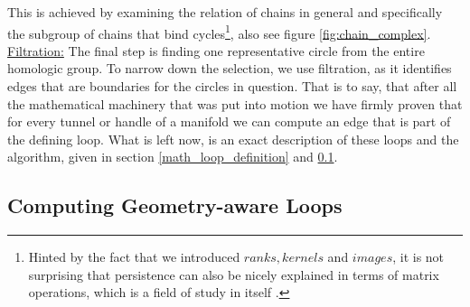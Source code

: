 This is achieved by examining the relation of chains in general and specifically the subgroup of chains that bind cycles\footnote{ Hinted by the fact that we introduced $ranks, kernels$ and $images$, it is not surprising that persistence can also be nicely explained in terms of matrix operations, which is a field of study in itself \citep[see chapters IV-3 and VI-1 in][]{Edelsbrunner2006}.}, also see figure \ref{fig:chain_complex}.\\
\underline{Filtration:} The final step is finding one representative circle from the entire homologic group.
To narrow down the selection, we use filtration, as it identifies edges that are boundaries for the circles in question.
That is to say, that after all the mathematical machinery that was put into motion we have firmly proven that for every tunnel or handle of a manifold we can compute an edge that is part of the defining loop.
What is left now, is an exact description of these loops and the algorithm, given in section \ref{math_loop_definition} and \ref{math_loop_computation}.

\subsection{Computing Geometry-aware Loops}
\label{math_loop_computation}

